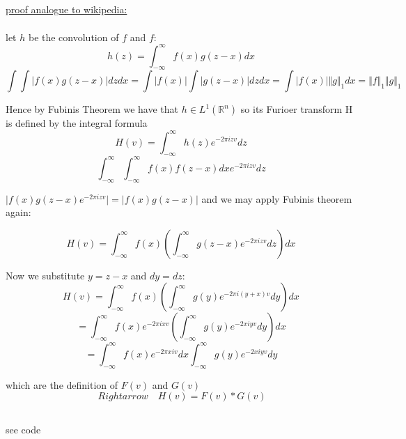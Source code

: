 \documentclass[12pt]{article}
\newcommand{\R}{\mathbb{R}}
\newcommand{\intinfty}{\int^{\infty}_{-\infty}}
\begin{document}

\setcounter{section}{9}
\setcounter{subsection}{0}


\subsection{ }


\subsection{ }

\underline{proof analogue to wikipedia:}\\\\

let $h$ be the convolution of $f$ and $f$:
$$ h(z) = \int^\infty_{-\infty} f(x)g(z-x) dx$$
$$\int \int \vert f(x)g(z-x) \vert dz dx = \int \vert f(x) \vert \int \vert g(z-x) \vert dz dx = \int \vert f(x) \vert \Vert g \Vert_1 dx = \Vert f \Vert_1 \Vert g \Vert_1$$

Hence by Fubinis Theorem we have that $h \in L^1(\R^n)$ so its Furioer transform H is defined by the integral formula
$$H(v) = \int^\infty_{-\infty} h(z)e^{-2 \pi i z v} dz$$
$$ \int^\infty_{-\infty} \int^\infty_{-\infty} f(x) f(z-x) dx e^{-2 \pi i z v} dz$$

$\vert f(x) g(z-x) e^{-2 \pi i z v} \vert = \vert f(x) g(z-x) \vert$ and we may apply Fubinis theorem again:

$$ H(v) = \int^\infty_{-\infty} f(x) (\int^\infty_{-\infty} g(z-x)e^{-2 \pi i z v} dz) dx$$

Now we substitute $y = z - x$ and $dy = dz$:
$$ H(v) = \intinfty f(x) ( \intinfty g(y)e^{-2 \pi i (y + x) v}dy)dx$$
$$ = \intinfty f(x) e ^{-2 \pi i x v} (\intinfty g(y) e ^{-2 x i y v}dy)dx$$
$$ = \intinfty f(x) e ^{-2 \pi x i v} dx \intinfty g(y)e^{-2 x i y v} dy$$

which are the definition of $F(v)$ and $G(v)$
$$ \ Rightarrow \quad H(v) = F(v) * G(v) $$




\subsection{ }



\subsection{ }
see code
\end{document}
